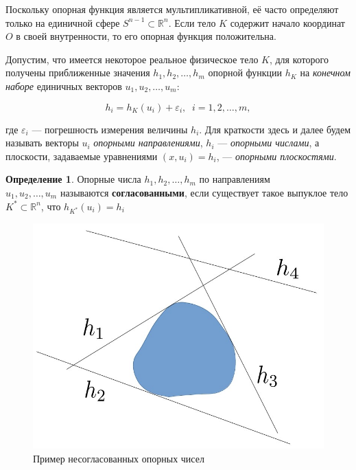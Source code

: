 \documentclass[a4paper, 10pt]{article}
\theoremstyle{definition}
\newtheorem{SmartDefinition}{Определение}
\theoremstyle{plain}
\theoremstyle{plain}
\begin{document}
Поскольку опорная функция является мультипликативной, её часто определяют только
на единичной сфере $S^{n - 1} \subset \mathbb{R}^{n}$. Если тело $K$ содержит
начало координат $O$ в своей внутренности, то его опорная функция положительна.

Допустим, что имеется некоторое реальное физическое тело $K$, для которого
получены приближенные значения $h_{1}, h_{2}, \ldots, h_{m}$ опорной функции
$h_{K}$ на \textit{конечном наборе} единичных векторов
$u_{1}, u_{2}, \ldots, u_{m}$:

\begin{equation}
 h_{i} = h_{K}(u_{i}) + \varepsilon_{i}, \;\; i = 1, 2, \ldots, m,
\end{equation}

где $\varepsilon_{i}$ --- погрешность измерения величины $h_{i}$. Для краткости
здесь и далее будем называть векторы $u_{i}$ \textit{опорными направлениями},
$h_{i}$ --- \textit{опорными числами}, а плоскости, задаваемые уравнениями
$(x, u_{i}) = h_{i}$, --- \textit{опорными плоскостями}.

\begin{SmartDefinition}
 \label{def:consistency}
 Опорные числа $h_{1}, h_{2}, \ldots, h_{m}$ по направлениям \\
 $u_{1}, u_{2}, \ldots, u_{m}$ называются \textbf{согласованными}, если
 существует такое выпуклое тело  $K^{*} \subset \mathbb{R}^{n}$, что
 $h_{K^{*}}(u_{i}) = h_{i}$
\end{SmartDefinition}

\begin{figure}
 \begin{center}
  \includegraphics[scale=0.25]{images/Incosistency-example.jpg}
 \end{center}
 \caption{Пример несогласованных опорных чисел}
 \label{image:inconsistent}
\end{figure}
\end{document}
